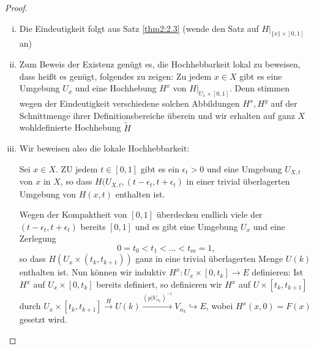 \documentclass[a4paper,10pt]{scrartcl}
\begin{document}
\begin{proof}
 \begin{enumerate}[(i)]
  \item Die Eindeutigkeit folgt aus Satz \ref{thm2:2.3} (wende den Satz auf $H|_{\{x\}\times[0,1]}$ an)
  \item Zum Beweis der Existenz genügt es, die Hochhebbarkeit lokal zu beweisen, dass heißt es genügt, folgendes zu zeigen:
\fixme[fig73]
Zu jedem $x\in X$ gibt es eine Umgebung $U_x$ und eine Hochhebung $H^x$ von $H|_{U_x\times[0,1]}$. Denn stimmen wegen der Eindeutigkeit verschiedene solchen Abbildungen $H^x, H^y$ auf der Schnittmenge ihrer Definitionsbereiche überein und wir erhalten auf ganz $X$ wohldefinierte Hochhebung $\tilde H$
\item Wir beweisen also die lokale Hochhebbarkeit: 

Sei $x\in X$. ZU jedem $t\in[0,1]$ gibt es ein $\epsilon_t>0$ und eine Umgebung $U_{X,t}$ von $x$ in $X$, so dass $H(U_{X,t}, (t-\epsilon_t, t+ \epsilon_t)$ in einer trivial überlagerten Umgebung von $H(x,t)$ enthalten ist.

Wegen der Kompaktheit von $[0,1]$ überdecken endlich viele der $(t-\epsilon_t, t+\epsilon_t)$ bereits $[0,1]$ und es gibt eine Umgebung $U_x$ und eine Zerlegung
\[
 0=t_0<t_1<...<t_m=1,
\]
so dass $H(U_x\times (t_k, t_{k+1}))$ ganz in eine trivial überlagerten Menge $U(k)$ enthalten ist. Nun können wir induktiv $H^x: U_{x}\times [0,t_k] \to E$ definieren: Ist $H^x$ auf $U_x\times [0,t_k]$ bereits definiert, so definieren wir $H^x$ auf $U\times[t_k,t_{k+1}]$ durch $U_x\times [t_k, t_{k+1}]\stackrel{H}{\to} U(k) \stackrel{(p|V_{\alpha_k})^{-1}}\to V_{\alpha_k}\hookrightarrow E$, wobei $H^x(x,0)=F(x)$ gesetzt wird.
 \end{enumerate}

\end{proof}
\end{document}
